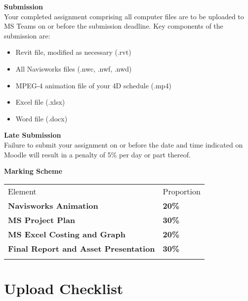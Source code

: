 \vspace{1cm}





\textbf{Submission}\\

Your completed assignment comprising all computer files are to be uploaded to MS Teams on or before the submission deadline.  Key components of the submission are:
\begin{itemize}
	\item Revit file, modified as necessary (.rvt)
	\item All Navisworks files (.nwc, .nwf, .nwd)
	\item MPEG-4 animation file of your 4D schedule (.mp4) 
	\item Excel file (.xlsx)
	\item Word file (.docx)
\end{itemize}


\textbf{Late Submission}\\
Failure to submit your assignment on or before the date and time indicated on Moodle will result in a penalty of 5\% per day or part thereof.

\vspace{0.5cm}
\textbf{Marking Scheme}

\begin{table}[h!]
     \begin{center}
     \begin{tabular}{p{7cm}  p{3cm} }
     \toprule
      \textbf\large{Element} & \textbf\large{Proportion} \\ 
    \cmidrule(r){1-1}\cmidrule(lr){2-2}
      \textbf{Navisworks Animation} & \textbf{20\%}\\
      \textbf{MS Project Plan } & \textbf{30\%}\\
      \textbf{MS Excel Costing and Graph} & \textbf{20\%}\\
      \textbf{Final Report and Asset Presentation} & \textbf{30\%}\\     
      \\ \bottomrule
      \end{tabular}
      \label{tbl:markSchemeAsmt3}
      \end{center}
 \end{table}


\section*{Upload Checklist}


